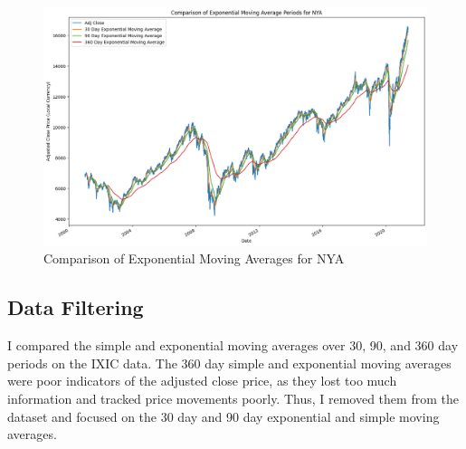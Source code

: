 \documentclass[a4paper, 11pt]{article}
\begin{document}
\begin{figure}[H]
    \begin{center}
        \includegraphics[width=1\textwidth]{Exponential Moving Averages for NYA.png}
        \caption{Comparison of Exponential Moving Averages for NYA}
    \end{center}
\end{figure}

\subsection{Data Filtering}
I compared the simple and exponential moving averages over 30, 90, and 360 day periods on the IXIC data. The 360 day simple and exponential moving averages were poor indicators of the adjusted close price, as they lost too much information and tracked price movements poorly. Thus, I removed them from the dataset and focused on the 30 day and 90 day exponential and simple moving averages.
\end{document}
